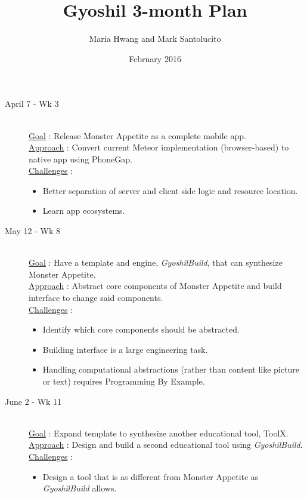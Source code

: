 \documentclass{article}
\title{\vspace{-2cm}Gyoshil 3-month Plan}
\author{Maria Hwang and Mark Santolucito}
\date{February 2016}
\begin{document}
\maketitle


\begin{description}
    \item[April 7 - Wk 3] \hfill \\
    \underline{Goal} : Release Monster Appetite as a complete mobile app. \\
    \underline{Approach} : Convert current Meteor implementation (browser-based) to native app using PhoneGap. \\
    \underline{Challenges} :
    \begin{itemize}
        \item Better separation of server and client side logic and resource location.
        \item Learn app ecosystems.
    \end{itemize}


    \item[May 12 - Wk 8] \hfill \\
    \underline{Goal} : Have a template and engine, \textit{GyoshilBuild}, that can synthesize Monster Appetite.\\
    \underline{Approach} : Abstract core components of Monster Appetite and build interface to change said components.\\
    \underline{Challenges} :
    \begin{itemize}
        \item Identify which core components should be abstracted.
        \item Building interface is a large engineering task.
        \item Handling computational abstractions (rather than content like picture or text) requires Programming By Example.
    \end{itemize}

    \item[June 2 -  Wk 11] \hfill \\
    \underline{Goal} : Expand template to synthesize another educational tool, ToolX.\\
    \underline{Approach} : Design and build a second educational tool using \textit{GyoshilBuild}.\\
    \underline{Challenges} :
    \begin{itemize}
        \item Design a tool that is as different from Monster Appetite as \textit{GyoshilBuild} allows.
    \end{itemize}


\end{description}
\end{document}
